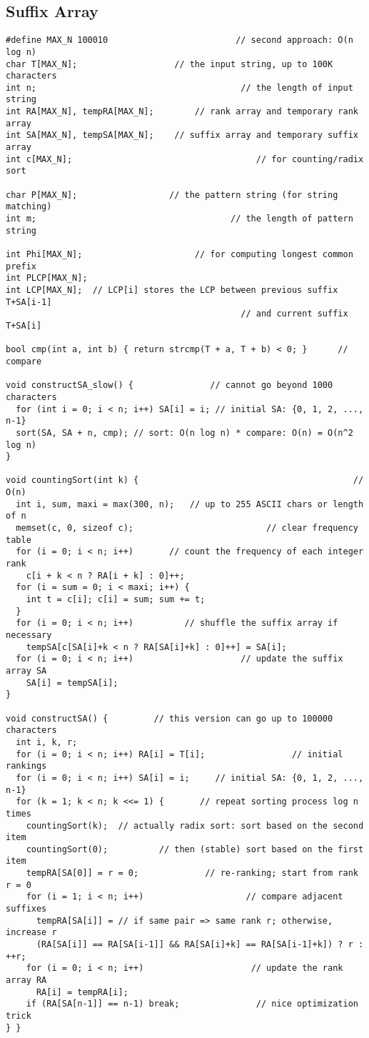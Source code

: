 \documentclass[letterpaper]{article}
\begin{document}
\subsection{Suffix Array}
\begin{lstlisting}
#define MAX_N 100010                         // second approach: O(n log n)
char T[MAX_N];                   // the input string, up to 100K characters
int n;                                        // the length of input string
int RA[MAX_N], tempRA[MAX_N];        // rank array and temporary rank array
int SA[MAX_N], tempSA[MAX_N];    // suffix array and temporary suffix array
int c[MAX_N];                                    // for counting/radix sort

char P[MAX_N];                  // the pattern string (for string matching)
int m;                                      // the length of pattern string

int Phi[MAX_N];                      // for computing longest common prefix
int PLCP[MAX_N];
int LCP[MAX_N];  // LCP[i] stores the LCP between previous suffix T+SA[i-1]
                                              // and current suffix T+SA[i]

bool cmp(int a, int b) { return strcmp(T + a, T + b) < 0; }      // compare

void constructSA_slow() {               // cannot go beyond 1000 characters
  for (int i = 0; i < n; i++) SA[i] = i; // initial SA: {0, 1, 2, ..., n-1}
  sort(SA, SA + n, cmp); // sort: O(n log n) * compare: O(n) = O(n^2 log n)
}

void countingSort(int k) {                                          // O(n)
  int i, sum, maxi = max(300, n);   // up to 255 ASCII chars or length of n
  memset(c, 0, sizeof c);                          // clear frequency table
  for (i = 0; i < n; i++)       // count the frequency of each integer rank
    c[i + k < n ? RA[i + k] : 0]++;
  for (i = sum = 0; i < maxi; i++) {
    int t = c[i]; c[i] = sum; sum += t;
  }
  for (i = 0; i < n; i++)          // shuffle the suffix array if necessary
    tempSA[c[SA[i]+k < n ? RA[SA[i]+k] : 0]++] = SA[i];
  for (i = 0; i < n; i++)                     // update the suffix array SA
    SA[i] = tempSA[i];
}

void constructSA() {         // this version can go up to 100000 characters
  int i, k, r;
  for (i = 0; i < n; i++) RA[i] = T[i];                 // initial rankings
  for (i = 0; i < n; i++) SA[i] = i;     // initial SA: {0, 1, 2, ..., n-1}
  for (k = 1; k < n; k <<= 1) {       // repeat sorting process log n times
    countingSort(k);  // actually radix sort: sort based on the second item
    countingSort(0);          // then (stable) sort based on the first item
    tempRA[SA[0]] = r = 0;             // re-ranking; start from rank r = 0
    for (i = 1; i < n; i++)                    // compare adjacent suffixes
      tempRA[SA[i]] = // if same pair => same rank r; otherwise, increase r
      (RA[SA[i]] == RA[SA[i-1]] && RA[SA[i]+k] == RA[SA[i-1]+k]) ? r : ++r;
    for (i = 0; i < n; i++)                     // update the rank array RA
      RA[i] = tempRA[i];
    if (RA[SA[n-1]] == n-1) break;               // nice optimization trick
} }


\end{lstlisting}
\end{document}
